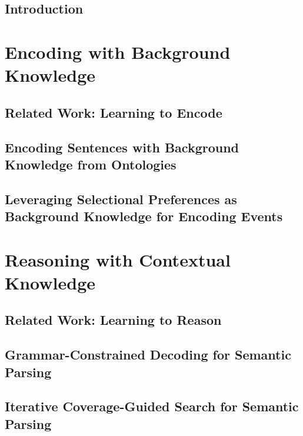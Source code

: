 \documentclass[hidelinks,12pt]{cmuthesis}
\begin{document}
\chapter{Introduction}
\label{chapter:introduction}

%
\part{Encoding with Background Knowledge}
\chapter{Related Work: Learning to Encode}
\label{chapter:encoding_related_work}

\chapter{Encoding Sentences with Background Knowledge from Ontologies}
\label{chapter:ontolstm}

\chapter{Leveraging Selectional Preferences as Background Knowledge for Encoding Events}
\label{chapter:nem}

\part{Reasoning with Contextual Knowledge}
\chapter{Related Work: Learning to Reason}
\label{chapter:reasoning_related_work}

\chapter{Grammar-Constrained Decoding for Semantic Parsing}
\label{chapter:wikitables}

\chapter{Iterative Coverage-Guided Search for Semantic Parsing}
\label{chapter:nlvr}

\end{document}
